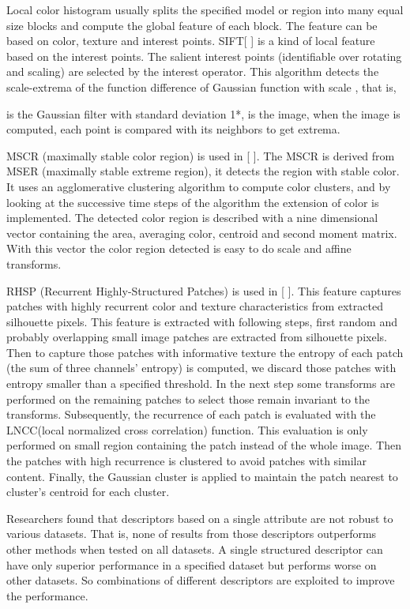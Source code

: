 Local color histogram usually splits the specified model or region into many equal size blocks and compute the global feature of each block. The feature can be based on color, texture and interest points. SIFT[ ] is a kind of local feature based on the interest points. The salient interest points (identifiable over rotating and scaling) are selected by the interest operator. This algorithm detects the scale-extrema of the function difference of Gaussian function with scale , that is, 

 is the Gaussian filter with standard deviation 1*,  is the image, when the  image is computed, each point  is compared with its neighbors to get  extrema.

MSCR (maximally stable color region) is used in [ ]. The MSCR is derived from MSER (maximally stable extreme region), it detects the region with stable color. It uses an agglomerative clustering algorithm to compute color clusters, and by looking at the successive time steps of the algorithm the extension of color is implemented. The detected color region is described with a nine dimensional vector containing the area, averaging color, centroid and second moment matrix. With this vector the color region detected is easy to do scale and affine transforms.

RHSP (Recurrent Highly-Structured Patches) is used in [ ]. This feature captures patches with highly recurrent color and texture characteristics from extracted silhouette pixels. This feature is extracted with following steps, first random and probably overlapping small image patches are extracted from silhouette pixels. Then to capture those patches with informative texture the entropy of each patch (the sum of three channels' entropy) is computed, we discard those patches with entropy smaller than a specified threshold. In the next step some transforms are performed on the remaining patches to select those remain invariant to the transforms. Subsequently, the recurrence of each patch is evaluated with the LNCC(local normalized cross correlation) function. This evaluation is only performed on small region containing the patch instead of the whole image. Then the patches with high recurrence is clustered to avoid patches with similar content. Finally, the Gaussian cluster is applied to maintain the patch nearest to cluster's centroid for each cluster.
 
Researchers found that descriptors based on a single attribute are not robust to various datasets. That is, none of results from those descriptors outperforms other methods when tested on all datasets. A single structured descriptor can have only superior performance in a specified dataset but performs worse on other datasets. So combinations of different descriptors are exploited to improve the performance. 

